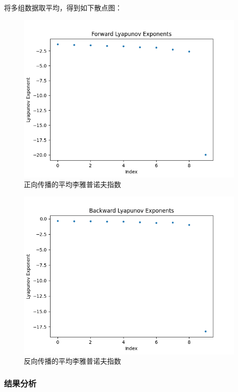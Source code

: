 将多组数据取平均，得到如下散点图：

\begin{figure}[htbp]
  \centering
  \includegraphics[width=1\textwidth]{figures/forward_lyapunov_avg.png}
  \caption{正向传播的平均李雅普诺夫指数}
  \label{fig:nn_lyapunov_exponents}
\end{figure}

\begin{figure}[htbp]
  \centering
  \includegraphics[width=1\textwidth]{figures/backward_lyapunov_avg.png}
  \caption{反向传播的平均李雅普诺夫指数}
  \label{fig:nn_lyapunov_exponents}
\end{figure}

\subsubsection{结果分析}

